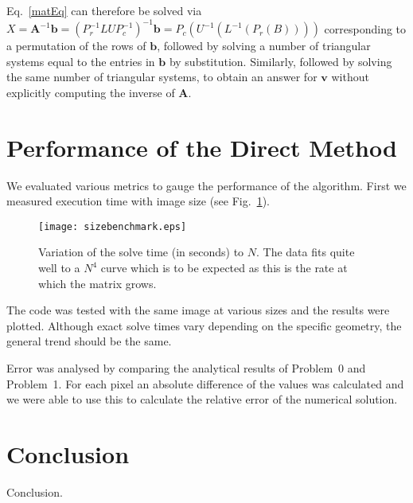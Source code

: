 \documentclass[a4paper]{article}
\newcommand{\mat}[1]{\mathbf{#1}}
\newcommand{\vect}[1]{\bm{#1}}
\begin{document}
Eq.~\eqref{matEq} can therefore be solved via
$X = \mat{A}^{-1}\vect{b}= (P_r^{-1}LUP_c^{-1})^{-1}\vect{b} =
P_c(U^{-1}(L^{-1}(P_r(B))))$
corresponding to a permutation of the rows of $\vect{b}$, followed by solving a
number of triangular systems equal to the entries in $\vect{b}$ by substitution.
Similarly, followed by solving the same number of triangular systems, to obtain
an answer for $\vect{v}$ without explicitly computing the inverse of $\mat{A}$.

\section{Performance of the Direct Method}
We evaluated various metrics to gauge the performance of the algorithm. First
we measured execution time with image size (see Fig.~\ref{sizetestFig}).
\begin{figure}
	\centering
	\texttt{[image: sizebenchmark.eps]}
	\caption{Variation of the solve time (in seconds) to $N$. The data fits
	quite well to a $N^4$ curve which is to be expected as this is the rate
	at which the matrix grows.}
	\label{sizetestFig}
\end{figure}
The code was tested with the same image at various sizes and the results were
plotted. Although exact solve times vary depending on the specific geometry,
the general trend should be the same.

Error was analysed by comparing the analytical results of Problem~0 and
Problem~1. For each pixel an absolute difference of the values was calculated
and we were able to use this to calculate the relative error of the numerical
solution.
        
\section*{Conclusion}
Conclusion.
\end{document}
